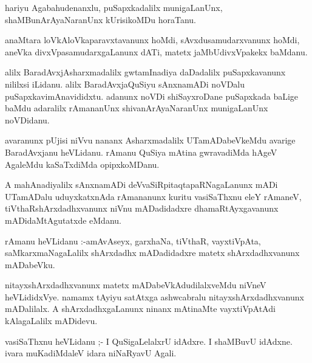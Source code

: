\documentclass{article}
\begin{document}
\begin{mn}
hariyu  Agabahudenanxlu,  puSapxkadalilx  munigaLanUnx,  shaMBunArAyaNaranUnx  kUrisikoMDu  horaTanu.
\end{mn}

\begin{mn}
anaMtara  loVkAloVkaparavxtavanunx  hoMdi,  sAvxdusamudarxvanunx  hoMdi,  aneVka  divxVpasamudarxgaLanunx  dATi,  
matetx  jaMbUdivxVpakekx  baMdanu.
\end{mn}

\begin{mn}
alilx  BaradAvxjAsharxmadalilx  gwtamInadiya  daDadalilx  puSapxkavanunx  nililxsi  iLidanu.  alilx  
BaradAvxjaQuSiyu  sAnxnamADi  noVDalu  puSapxkavimAnavididxtu.  adanunx  noVDi  shiSayxroDane  puSapxkada  
baLige  baMdu  adaralilx  rAmananUnx  shivanArAyaNaranUnx  munigaLanUnx  noVDidanu.
\end{mn}

\begin{mn}
avaranunx  pUjisi  niVvu  nananx  Asharxmadalilx  UTamADabeVkeMdu  avarige  BaradAvxjanu  heVLidanu.  rAmanu  
QuSiya  mAtina  gwravadiMda  hAgeV  AgaleMdu  kaSaTxdiMda  opipxkoMDanu.
\end{mn}

\begin{mn}
A mahAnadiyalilx  sAnxnamADi  deVvaSiRpitaqtapaRNagaLanunx  mADi  UTamADalu  uduyxkatxnAda  rAmananunx  kuritu  
vasiSaThxnu  eleY  rAmaneV,  tiVthaRshArxdadhxvanunx  niVnu  mADadidadxre  dhamaRtAyxgavanunx  mADidaMtAgutatxde  eMdanu.
\end{mn}

\begin{mn}
rAmanu  heVLidanu :-amAvAseyx,  garxhaNa,  tiVthaR,  vayxtiVpAta,  saMkarxmaNagaLalilx  shArxdadhx  mADadidadxre  
matetx  shArxdadhxvanunx  mADabeVku.
\end{mn}

\begin{mn}
nitayxshArxdadhxvanunx  matetx  mADabeVkAdudilalxveMdu  niVneV  heVLididxVye.  namamx  tAyiyu  satAtxga  ashwcabralu  
nitayxshArxdadhxvanunx  mADalilalx.   A  shArxdadhxgaLanunx  ninanx  mAtinaMte  vayxtiVpAtAdi  kAlagaLalilx  mADidevu.
\end{mn}

\begin{mn}
vasiSaThxnu  heVLidanu ;- I  QuSigaLelalxrU  idAdxre.  I  shaMBuvU  idAdxne.  ivara  muKadiMdaleV  idara  niNaRyavU  Agali.
\end{mn}
\end{document}
